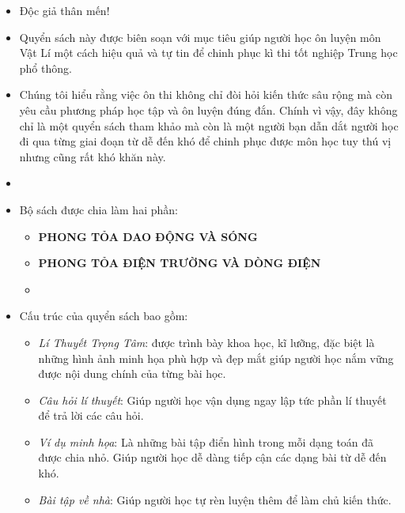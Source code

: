 \par
\begin{itemize}
	\item[] Độc giả thân mến!
	\item[] Quyển sách này được biên soạn với mục tiêu giúp người học ôn luyện môn Vật Lí một cách hiệu quả và tự tin để chinh phục kì thi tốt nghiệp Trung học phổ thông. 
	\item[] Chúng tôi hiểu rằng việc ôn thi không chỉ đòi hỏi kiến thức sâu rộng mà còn yêu cầu phương pháp học tập và ôn luyện đúng đắn. Chính vì vậy, đây không chỉ là một quyển sách tham khảo mà còn là một người bạn dẫn dắt người học đi qua từng giai đoạn từ dễ đến khó để chinh phục được môn học tuy thú vị nhưng cũng rất khó khăn này.
	\item[]
	\item[]  Bộ sách được chia làm hai phần:
	\begin{itemize}
		\item[] \textcolor{coolblack}{\textbf{PHONG TỎA DAO ĐỘNG VÀ SÓNG}} 
		\item[] \textcolor{coolblack}{\textbf{PHONG TỎA ĐIỆN TRƯỜNG VÀ DÒNG ĐIỆN}}
		\item[]
	\end{itemize}
	\item[] Cấu trúc của quyển sách bao gồm: 
	\begin{itemize}
		\item[$\bullet$]  \textit{Lí Thuyết Trọng Tâm}: được trình bày khoa học, kĩ lưỡng, đặc biệt là những hình ảnh minh họa phù hợp và đẹp mắt giúp người học nắm vững được nội dung chính của từng bài học.
		\item[$\bullet$]  \textit{Câu hỏi lí thuyết}: Giúp người học vận dụng ngay lập tức phần lí thuyết để trả lời các câu hỏi.
		\item[$\bullet$] \textit{Ví dụ minh họa}: Là những bài tập điển hình trong mỗi dạng toán đã được chia nhỏ. Giúp người học dễ dàng tiếp cận các dạng bài từ dễ đến khó.
		\item[$\bullet$] \textit{Bài tập về nhà}: Giúp người học tự rèn luyện thêm để làm chủ kiến thức.
	\end{itemize}
	

\end{itemize}
